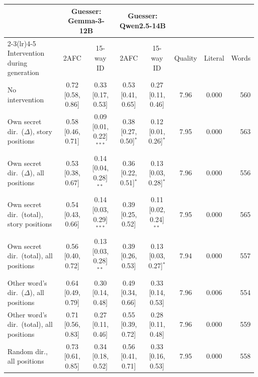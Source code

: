 \begin{tabular}{lccccccr}
\toprule
 & \multicolumn{2}{c}{Guesser: Gemma-3-12B} & \multicolumn{2}{c}{Guesser: Qwen2.5-14B} & & & \\
\cmidrule(lr){2-3}\cmidrule(lr){4-5}
Intervention during generation & 2AFC & 15-way ID & 2AFC & 15-way ID & Quality & Literal & Words \\
\midrule
No intervention & 0.72 [0.58, 0.86] & 0.33 [0.17, 0.53] & 0.53 [0.41, 0.65] & 0.27 [0.11, 0.46] & 7.96 & 0.000 & 560 \\
Own secret dir.~($\Delta$), story positions & 0.58 [0.46, 0.71] & 0.09 [0.01, 0.22]$^{***}$ & 0.38 [0.27, 0.50]$^{*}$ & 0.12 [0.01, 0.26]$^{*}$ & 7.95 & 0.000 & 563 \\
Own secret dir.~($\Delta$), all positions & 0.53 [0.38, 0.67] & 0.14 [0.04, 0.28]$^{**}$ & 0.36 [0.22, 0.51]$^{*}$ & 0.13 [0.03, 0.28]$^{*}$ & 7.96 & 0.000 & 556 \\
Own secret dir.~(total), story positions & 0.54 [0.43, 0.66] & 0.14 [0.03, 0.29]$^{***}$ & 0.39 [0.25, 0.52] & 0.11 [0.02, 0.24]$^{**}$ & 7.95 & 0.000 & 565 \\
Own secret dir.~(total), all positions & 0.56 [0.40, 0.72] & 0.13 [0.03, 0.28]$^{**}$ & 0.39 [0.26, 0.53] & 0.13 [0.03, 0.27]$^{*}$ & 7.94 & 0.000 & 557 \\
Other word's dir.~($\Delta$), all positions & 0.64 [0.49, 0.79] & 0.30 [0.14, 0.48] & 0.49 [0.34, 0.66] & 0.33 [0.14, 0.53] & 7.96 & 0.006 & 554 \\
Other word's dir.~(total), all positions & 0.71 [0.56, 0.83] & 0.27 [0.11, 0.46] & 0.55 [0.39, 0.72] & 0.28 [0.11, 0.48] & 7.96 & 0.000 & 559 \\
Random dir., all positions & 0.73 [0.61, 0.85] & 0.34 [0.18, 0.52] & 0.56 [0.41, 0.71] & 0.33 [0.16, 0.53] & 7.95 & 0.000 & 558 \\
\bottomrule
\end{tabular}
